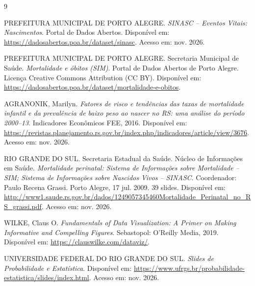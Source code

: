 \documentclass[12pt,a4paper]{article}
\begin{document}
\begin{thebibliography}{9}

PREFEITURA MUNICIPAL DE PORTO ALEGRE.
\textit{SINASC -- Eventos Vitais: Nascimentos}.
Portal de Dados Abertos. Disponível em:
\url{https://dadosabertos.poa.br/dataset/sinasc}.
Acesso em: nov. 2026.

PREFEITURA MUNICIPAL DE PORTO ALEGRE. Secretaria Municipal de Saúde.
\textit{Mortalidade e óbitos (SIM)}. Portal de Dados Abertos de Porto Alegre.
Licença Creative Commons Attribution (CC BY).
Disponível em: \url{https://dadosabertos.poa.br/dataset/mortalidade-e-obitos}.

AGRANONIK, Marilyn.
\textit{Fatores de risco e tendências das taxas de mortalidade infantil e da prevalência de baixo peso ao nascer no RS: uma análise do período 2000--13}.
Indicadores Econômicos FEE, 2016.
Disponível em:
\url{https://revistas.planejamento.rs.gov.br/index.php/indicadores/article/view/3676}.
Acesso em: nov. 2026.

RIO GRANDE DO SUL. Secretaria Estadual da Saúde. Núcleo de Informações em Saúde.
\textit{Mortalidade perinatal: Sistema de Informações sobre Mortalidade -- SIM; Sistema de Informações sobre Nascidos Vivos -- SINASC}.
Coordenador: Paulo Recena Grassi. Porto Alegre, 17 jul. 2009. 39 slides.
Disponível em:
\url{http://www1.saude.rs.gov.br/dados/1249057345460Mortalidade_Perinatal_no_RS_grassi.pdf}.
Acesso em: nov. 2026.

WILKE, Claus O.
\textit{Fundamentals of Data Visualization: A Primer on Making Informative and Compelling Figures}.
Sebastopol: O'Reilly Media, 2019. Disponível em:
\url{https://clauswilke.com/dataviz/}.

UNIVERSIDADE FEDERAL DO RIO GRANDE DO SUL.
\textit{Slides de Probabilidade e Estatística}.
Disponível em:
\url{https://www.ufrgs.br/probabilidade-estatistica/slides/index.html}.
Acesso em: nov. 2026.

\end{thebibliography}
\end{document}
